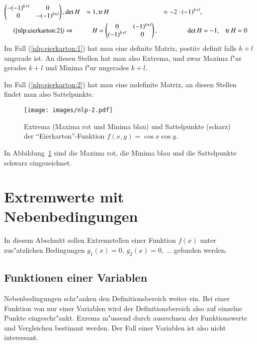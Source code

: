\begin{beispiel}
\begin{align*}
\begin{pmatrix}
-(-1)^{k+l}&0\\
0&-(-1)^{k+l}
\end{pmatrix},
&
\det H&=1,&
\operatorname{tr} H&= -2\cdot (-1)^{k+l},
\\
(\ref{nlp:eierkarton:2})
&\Rightarrow
&
H&=\begin{pmatrix}
0&(-1)^{k+l}\\
(-1)^{k+l}&0
\end{pmatrix},
&
\det H&=-1,
&
\operatorname{tr}H&=0
\end{align*}
Im Fall (\ref{nlp:eierkarton:1}) hat man eine definite Matrix,
postiiv definit falls $k+l$ ungerade ist. An diesen Stellen hat man
also Extrema, und zwar Maxima f"ur gerades $k+l$ und Minima f"ur ungerades
$k+l$.

Im Fall (\ref{nlp:eierkarton:2}) hat man eine indefinite Matrix,
an diesen Stellen findet man also Sattelpunkte.

\begin{figure}
\begin{center}
\texttt{[image: images/nlp-2.pdf]}
\end{center}
\caption{Extrema (Maxima rot und Minima blau) und Sattelpunkte (scharz) der
``Eierkarton''-Funktion $f(x,y)=\cos x\cos y$.
\label{nlp:eggcrate}}
\end{figure}
In Abbildung~\ref{nlp:eggcrate} sind die Maxima rot, die Minima blau
und die Sattelpunkte schwarz eingezeichnet.
\end{beispiel}

\section{Extremwerte mit Nebenbedingungen}
In diesem Abschnitt sollen Extremstellen einer Funktion $f(x)$ 
unter zus"atzlichen Bedingungen $g_1(x)=0$, $g_2(x)=0$, $\dots$
gefunden werden.
\subsection{Funktionen einer Variablen\label{nlp:nebenbedingungen:einevariable}}
Nebenbedingungen schr"anken den Definitionsbereich weiter ein.
Bei einer Funktion von nur einer Variablen wird der Definitionsbereich
also auf einzelne Punkte eingeschr"ankt. Exrema m"ussend durch ausrechnen
der Funktionswerte und Vergleichen bestimmt werden. 
Der Fall einer Variablen ist also nicht interessant.

